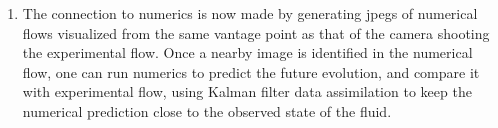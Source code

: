 \begin{description}
\begin{enumerate}
    \item The connection to numerics is now made by generating jpegs of
numerical flows visualized from the same vantage point as that of the camera
shooting the experimental flow. Once a nearby image is identified in the
numerical flow, one can run numerics to predict the future evolution, and
compare it with experimental flow, using Kalman filter data assimilation
to keep the numerical prediction close to the observed state of the
fluid.
\end{enumerate}

\end{description}
